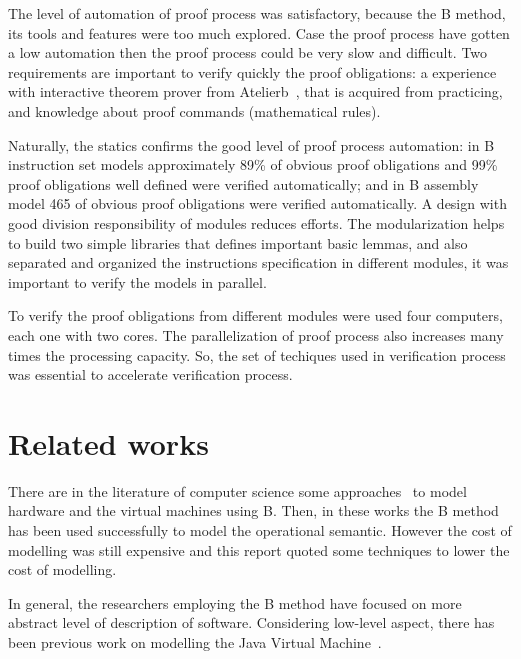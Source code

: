 \documentclass[11pt]{article} %
\begin{document}
The level of automation of proof process was satisfactory, because the B method,
its tools and features were too much explored. Case the proof process have gotten
a low automation then the proof process could be very slow and difficult. Two
requirements are important to verify quickly the proof obligations: a experience
with interactive theorem prover from Atelierb~\cite{CLEARSY}, that is acquired
from practicing, and knowledge about proof commands (mathematical
rules)\cite{ClearsyMathRule}.

Naturally, the statics confirms the good level of proof process automation: in B
instruction set models approximately 89\% of obvious proof obligations and 99\%
proof obligations well defined were verified automatically; and in B assembly
model 465 of obvious proof obligations were verified automatically. A design with
good division responsibility of modules reduces efforts. The modularization helps
to build two simple libraries that defines important basic lemmas, and also
separated and organized the instructions specification in different modules, it
was important to verify the models in parallel.

To verify the proof obligations from different modules were used four computers,
each one with two cores. The parallelization of proof process also increases many
times the processing capacity. So, the set of techiques used in verification
process was essential to accelerate verification process.

\section{Related works}
\label{sec:relatedworks}
 
There are in the literature of computer science some
approaches~\cite{BHDL_2003,GEMPLUS_99,DBLP:journals/entcs/EvansG08,DBLP:conf/fmco/Leuschel08,DBLP:conf/asm/Wright08}
to model hardware and the virtual machines using B. Then, in these works the B
method has been used successfully to model the operational semantic. However the
cost of modelling was still expensive and this report quoted some techniques to
lower the cost of modelling.




In general, the researchers employing the B method have focused on
more abstract level of description of software.  Considering low-level
aspect, there has been previous work on modelling the Java Virtual
Machine~\cite{GEMPLUS_99}.
\end{document}
